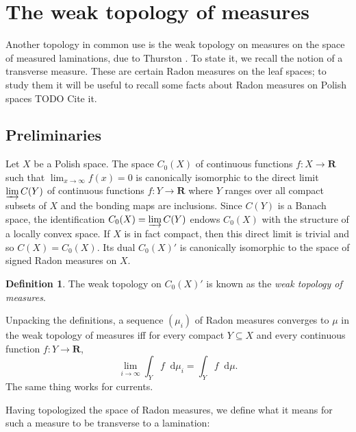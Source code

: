 \documentclass[reqno,11pt]{amsart}
\newcommand{\RR}{\mathbf{R}}
\newcommand*\dif{\mathop{}\!\mathrm{d}}
\newcommand{\dfn}[1]{\emph{#1}\index{#1}}
\newtheorem{proposition}[theorem]{Proposition}
\theoremstyle{definition}
\newtheorem{definition}[theorem]{Definition}
\numberwithin{equation}{section}
\begin{document}

\section{The weak topology of measures}
Another topology in common use is the weak topology on measures on the space of measured laminations, due to Thurston \cite[Chapter 8]{thurston1998minimal}.
To state it, we recall the notion of a transverse measure.
These are certain Radon measures on the leaf spaces; to study them it will be useful to recall some facts about Radon measures on Polish spaces TODO Cite it.

\subsection{Preliminaries}
Let $X$ be a Polish space.
The space $C_0(X)$ of continuous functions $f: X \to \RR$ such that $\lim_{x \to \infty} f(x) = 0$ is canonically isomorphic to the direct limit $\varinjlim C(Y)$ of continuous functions $f: Y \to \RR$ where $Y$ ranges over all compact subsets of $X$ and the bonding maps are inclusions.
Since $C(Y)$ is a Banach space, the identification $C_0(X) = \varinjlim C(Y)$ endows $C_0(X)$ with the structure of a locally convex space.
If $X$ is in fact compact, then this direct limit is trivial and so $C(X) = C_0(X)$.
Its dual $C_0(X)'$ is canonically isomorphic to the space of signed Radon measures on $X$.

\begin{definition}
The weak topology on $C_0(X)'$ is known as the \dfn{weak topology of measures}.
\end{definition}

Unpacking the definitions, a sequence $(\mu_i)$ of Radon measures converges to $\mu$ in the weak topology of measures iff for every compact $Y \subseteq X$ and every continuous function $f: Y \to \RR$,
$$\lim_{i \to \infty} \int_Y f \dif \mu_i = \int_Y f \dif \mu.$$
The same thing works for currents.
%

Having topologized the space of Radon measures, we define what it means for such a measure to be transverse to a lamination:
\end{document}
